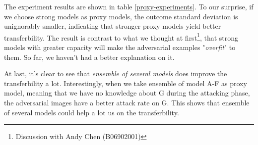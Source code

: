 \documentclass{article}
\begin{document}
The experiment results are shown in table \ref{proxy-experiments}. To our surprise, if we choose strong models as proxy models, the outcome standard deviation is unignorably smaller, indicating that stronger proxy models yield better transferbility. The result is contrast to what we thought at first\footnote{Discussion with Andy Chen (B06902001)}, that strong models with greater capacity will make the adversarial examples "\textit{overfit}" to them. So far, we haven't had a better explanation on it.

At last, it's clear to see that \textit{ensemble of several models} does improve the transferbility a lot. Interestingly, when we take ensemble of model A-F as proxy model, meaning that we have no knowledge about G during the attacking phase, the adversarial images have a better attack rate on G. This shows that ensemble of several models could help a lot us on the transferbility.
\end{document}
